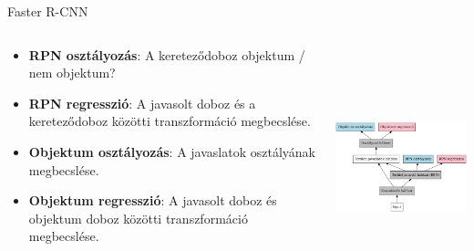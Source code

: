 \documentclass[english, aspectratio=169]{beamer}
\begin{document}
\begin{frame}{Faster R-CNN}
\begin{columns}
\begin{column}{.5\textwidth}
\begin{itemize}
	\item \textbf{RPN osztályozás}: A kereteződoboz objektum / nem objektum?
	\item \textbf{RPN regresszió}: A javasolt doboz és a kereteződoboz közötti transzformáció megbecslése.
	\item \textbf{Objektum osztályozás}: A javaslatok osztályának megbecslése.
	\item \textbf{Objektum regresszió}: A javasolt doboz és objektum doboz közötti transzformáció megbecslése. 
\end{itemize}
\end{column}
\begin{column}{.5\textwidth}
\begin{center}
\includegraphics[width=7cm, height=7cm, keepaspectratio]{graphs/od_7.png}
\end{center}
\end{column}
\end{columns}
\end{frame}
\end{document}
